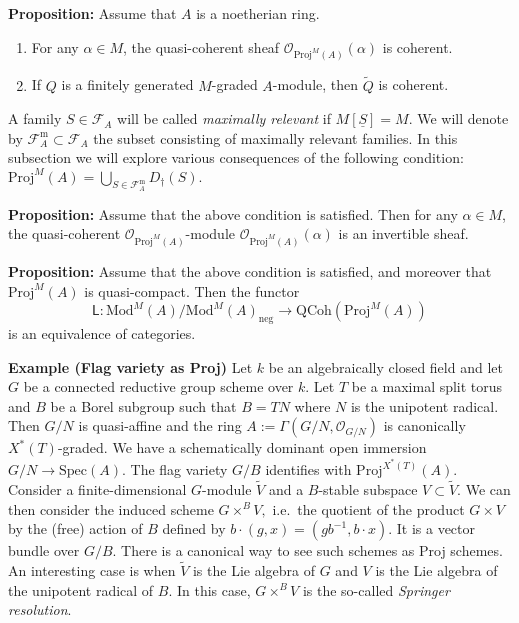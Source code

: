 \documentclass[graybox]{svmult}
\begin{document}
\vspace{0.25\baselineskip}
\noindent
\textbf{{Proposition:}}
Assume that $A$ is a noetherian ring.
\begin{enumerate}
\item
For any $\alpha \in M$, the quasi-coherent sheaf $\mathcal{O}_{\mathrm{Proj}^M(A)} (\alpha)$ is coherent.
\item
If $Q$ is a finitely generated $M$-graded $A$-module, then $\widetilde{Q}$ is coherent.
\end{enumerate}




A family $S \in \mathcal{F}_A$ will be called \emph{maximally relevant} if $M[\underline{S}]=M$.   We will denote by $\mathcal{F}_A^{\mathrm{m}} \subset \mathcal{F}_A$ the subset consisting of maximally relevant families. In this subsection we will explore various consequences of the following condition:
$
\mathrm{Proj}^M(A) = \bigcup_{S \in \mathcal{F}_A^{\mathrm{m}}} D_\dag(S).$



\vspace{0.25\baselineskip}
\noindent
\textbf{{Proposition:}}
Assume that the above condition is satisfied. Then for any $ \alpha \in M$, the quasi-coherent $\mathcal{O}_{\mathrm{Proj}^M(A)}$-module $\mathcal{O}_{\mathrm{Proj}^M(A)} (\alpha)$ is an invertible sheaf.



\vspace{0.25\baselineskip}
\noindent
\textbf{{Proposition:}}
Assume that the above condition is satisfied, and moreover that $\mathrm{Proj}^M(A)$ is quasi-compact. Then the functor
\[
\mathsf{L} : \mathrm{Mod}^M(A) / \mathrm{Mod}^M(A)_{\mathrm{neg}} \to \mathrm{QCoh}(\mathrm{Proj}^M(A))
\]
is an equivalence of categories.





\vspace{0.25\baselineskip}
\noindent
\textbf{Example (Flag variety as Proj)}
 Let $k$ be an algebraically closed field and let $G$ be
a connected reductive group scheme over $k.$ Let $T$ be a maximal split torus
and $B$ be a Borel subgroup such that $B = T N$ where $N$ is the unipotent
radical. Then $G/N$ is quasi-affine and the ring $A := \Gamma (G/N, \mathcal{O}_{G/N} )$ is canonically $X^*(T)$-graded. We have a schematically dominant open immersion
$G/N \to \mathrm{Spec}(A)$. 
The flag variety $G/B$ identifies with $\mathrm{Proj}^{X^*(T)} (A)$.
Consider a finite-dimensional $G$-module $\widetilde{V}$ and a $B$-stable subspace $V \subset \widetilde{V}$. 
We can then consider the induced scheme
$
 G \times^{B} V,
$
i.e.~the quotient of the product $G \times V$ by the (free) action of $B$ defined by $b \cdot (g,x) = (gb^{-1}, b \cdot x)$.  It is a vector bundle over $G/B$.
There is a canonical way to see such schemes as Proj schemes.
An interesting case is when $\widetilde{V}$ is the Lie algebra of $G$ and $V$ is the Lie algebra of the unipotent radical of $B$. In this case, $G \times^{B} V$ is the so-called \emph{Springer resolution}.
\end{document}
